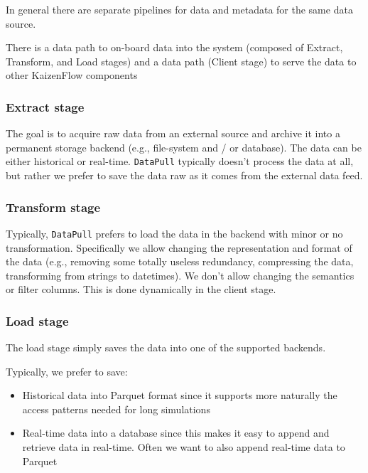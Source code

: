 \documentclass[11pt, reqno]{amsart}
\theoremstyle{definition}
\theoremstyle{remark}
\begin{document}
  In general there are separate pipelines for data and metadata for the same
  data source.

  There is a data path to on-board data into the system (composed of Extract,
  Transform, and Load stages) and a data path (Client stage) to serve the data
  to other KaizenFlow components


  \subsubsection{Extract stage}

  The goal is to acquire raw data from an external source and archive it into a permanent
  storage backend (e.g., file-system and / or database). The data can be either
  historical or real-time. \verb|DataPull| typically doesn't process the data at
  all, but rather we prefer to save the data raw as it comes from the external
  data feed.

  \subsubsection{Transform stage}

  Typically, \verb|DataPull| prefers to load the data in the backend with minor
  or no transformation. Specifically we allow changing the representation and format
  of the data (e.g., removing some totally useless redundancy, compressing the data,
  transforming from strings to datetimes). We don't allow changing the semantics
  or filter columns. This is done dynamically in the client stage.

  \subsubsection{Load stage}

  The load stage simply saves the data into one of the supported backends.

  Typically, we prefer to save:
  \begin{itemize}
    \item Historical data into Parquet format since it supports more naturally the
      access patterns needed for long simulations

    \item Real-time data into a database since this makes it easy to append and retrieve
      data in real-time. Often we want to also append real-time data to Parquet
  \end{itemize}
\end{document}

